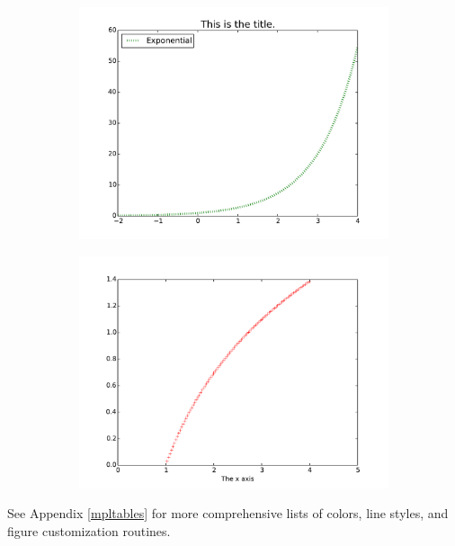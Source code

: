 \begin{figure}[H] %
\captionsetup[subfigure]{justification=centering}
\centering
\begin{subfigure}{.5\textwidth}
    \centering
    \includegraphics[width=\linewidth]{custom1.pdf}
    \label{fig:custom1}
\end{subfigure}%
\begin{subfigure}{.5\textwidth}
    \centering
    \includegraphics[width=\linewidth]{custom2.pdf}
    \label{fig:custom2}
\end{subfigure}
\label{fig:custom}
\end{figure}

See Appendix \ref{mpltables} for more comprehensive lists of colors, line styles, and figure customization routines.

